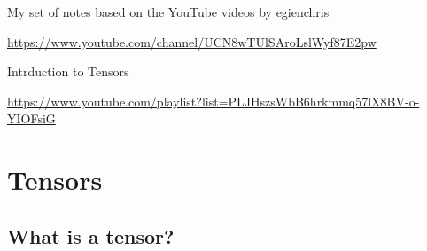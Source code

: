 \documentclass[a5paper,12pt]{book}
\begin{document}

\frontmatter
{}
My set of notes based on the YouTube videos by egienchris

\url{https://www.youtube.com/channel/UCN8wTUlSAroLslWyf87E2pw}\linebreak

Intrduction to Tensors

\url{https://www.youtube.com/playlist?list=PLJHszsWbB6hrkmmq57lX8BV-o-YIOFsiG}
\tableofcontents
\listoftables
\listoffigures
\clearpage
\mainmatter
\chapter{Tensors}
\section{What is a tensor?}

\clearpage

\clearpage
{}
\printindex
\end{document}
